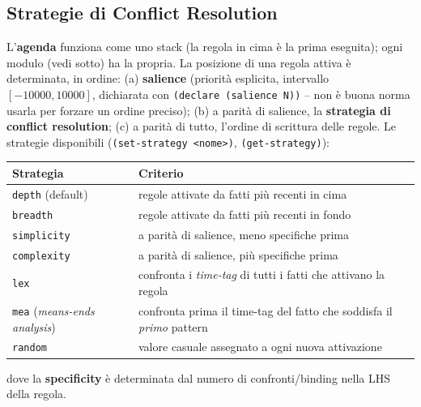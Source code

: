 \documentclass[a4paper,11pt]{article}
\begin{document}
\subsection{Strategie di Conflict Resolution}

L'\textbf{agenda} funziona come uno stack (la regola in cima è la prima eseguita); ogni modulo (vedi sotto) ha la propria. La posizione di una regola attiva è determinata, in ordine: (a) \textbf{salience} (priorità esplicita, intervallo $[-10000,10000]$, dichiarata con \texttt{(declare (salience N))} -- non è buona norma usarla per forzare un ordine preciso); (b) a parità di salience, la \textbf{strategia di conflict resolution}; (c) a parità di tutto, l'ordine di scrittura delle regole. Le strategie disponibili (\texttt{(set-strategy <nome>)}, \texttt{(get-strategy)}):

\begin{center}
\small
\begin{tabular}{ll}
\toprule
\textbf{Strategia} & \textbf{Criterio} \\
\midrule
\texttt{depth} (default) & regole attivate da fatti più recenti in cima \\
\texttt{breadth} & regole attivate da fatti più recenti in fondo \\
\texttt{simplicity} & a parità di salience, meno specifiche prima \\
\texttt{complexity} & a parità di salience, più specifiche prima \\
\texttt{lex} & confronta i \emph{time-tag} di tutti i fatti che attivano la regola \\
\texttt{mea} (\emph{means-ends analysis}) & confronta prima il time-tag del fatto che soddisfa il \emph{primo} pattern \\
\texttt{random} & valore casuale assegnato a ogni nuova attivazione \\
\bottomrule
\end{tabular}
\end{center}
dove la \textbf{specificity} è determinata dal numero di confronti/binding nella LHS della regola.
\end{document}
